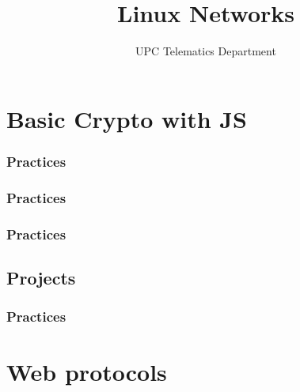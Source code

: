 \documentclass[english,10pt]{book}
\author{UPC Telematics Department}
\title{Linux Networks}
\date{}
\makeatletter
\def\thickhrulefill{\leavevmode \leaders \hrule height 1pt\hfill \kern \z@}
\def\maketitle{%
	\null
	\thispagestyle{empty}%
	{\large \raggedleft \@textoA\par}
	\vfill
	\begin{center}\leavevmode
	\normalfont
	{\LARGE\raggedleft \@author\par}%
	\thickhrulefill\par
	{\huge\raggedright \@title\par}%
	\vskip 1cm
	\end{center}%
	\vfill
	{\large \@textoB\par}
	\null
	
	\clearpage
}
\makeatother
\begin{document}

% 

\setcounter{tocdepth}{2}
\tableofcontents
\pagestyle{plain}


\chapter{Basic Crypto with JS \label{chap:basic-crypto-js}}


\subsection{Practices}



\subsection{Practices}



\subsection{Practices}


\section{Projects}
\subsection{Practices}






\chapter{Web protocols\label{chap:web-protocols}}

\end{document}
